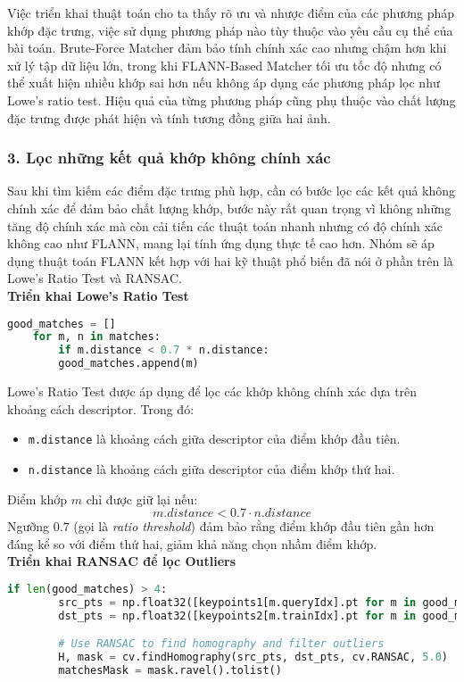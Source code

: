 Việc triển khai thuật toán cho ta thấy rõ ưu và nhược điểm của các phương pháp khớp đặc trưng, việc sử dụng phương pháp nào tùy thuộc vào yêu cầu cụ thể của bài toán. Brute-Force Matcher đảm bảo tính chính xác cao nhưng chậm hơn khi xử lý tập dữ liệu lớn, trong khi FLANN-Based Matcher tối ưu tốc độ nhưng có thể xuất hiện nhiều khớp sai hơn nếu không áp dụng các phương pháp lọc như Lowe's ratio test. Hiệu quả của từng phương pháp cũng phụ thuộc vào chất lượng đặc trưng được phát hiện và tính tương đồng giữa hai ảnh.

\subsubsection*{3. Lọc những kết quả khớp không chính xác}

Sau khi tìm kiếm các điểm đặc trưng phù hợp, cần có bước lọc các kết quả không chính xác để đảm bảo chất lượng khớp, bước này rất quan trọng vì không những tăng độ chính xác mà còn cải tiến các thuật toán nhanh nhưng có độ chính xác không cao như FLANN, mang lại tính ứng dụng thực tế cao hơn. Nhóm sẽ áp dụng thuật toán FLANN kết hợp với hai kỹ thuật phổ biến đã nói ở phần trên là Lowe's Ratio Test và RANSAC. \\
\textbf{Triển khai Lowe's Ratio Test}
\begin{lstlisting}[language=Python]
	good_matches = []
	for m, n in matches:
		if m.distance < 0.7 * n.distance:
		good_matches.append(m)
\end{lstlisting}

Lowe's Ratio Test được áp dụng để lọc các khớp không chính xác dựa trên khoảng cách descriptor. Trong đó:
\begin{itemize}
	\item \texttt{m.distance} là khoảng cách giữa descriptor của điểm khớp đầu tiên.
	\item \texttt{n.distance} là khoảng cách giữa descriptor của điểm khớp thứ hai.
\end{itemize}
Điểm khớp \( m \) chỉ được giữ lại nếu:
\[
m.distance < 0.7 \cdot n.distance
\]
Ngưỡng \( 0.7 \) (gọi là \textit{ratio threshold}) đảm bảo rằng điểm khớp đầu tiên gần hơn đáng kể so với điểm thứ hai, giảm khả năng chọn nhầm điểm khớp.\\
\textbf{Triển khai RANSAC để lọc Outliers}

\begin{lstlisting}[language=Python]
    if len(good_matches) > 4:
		src_pts = np.float32([keypoints1[m.queryIdx].pt for m in good_matches]).reshape(-1, 1, 2)
		dst_pts = np.float32([keypoints2[m.trainIdx].pt for m in good_matches]).reshape(-1, 1, 2)

		# Use RANSAC to find homography and filter outliers
		H, mask = cv.findHomography(src_pts, dst_pts, cv.RANSAC, 5.0)
		matchesMask = mask.ravel().tolist()
\end{lstlisting}

